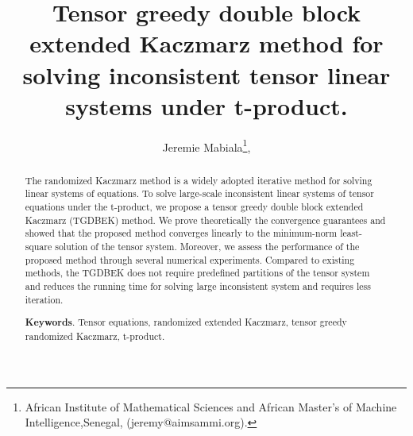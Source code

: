 \documentclass[11pt]{article}
\title{
Tensor greedy double block extended Kaczmarz method for solving inconsistent tensor linear systems under t-product.
}
\author{Jeremie Mabiala\thanks{African Institute of  Mathematical Sciences and African Master's of Machine Intelligence,Senegal, (jeremy@aimsammi.org).},%
}
\date{}
\begin{document}
\maketitle

\begin{abstract} 

The randomized Kaczmarz method is a widely adopted iterative method for solving  linear systems of equations. To solve large-scale inconsistent linear systems of tensor equations under the t-product, we propose a tensor greedy double block extended Kaczmarz (TGDBEK) method. We prove  theoretically the convergence guarantees and showed that the proposed method converges linearly to the minimum-norm least-square solution of the tensor system. Moreover, we assess the performance of the proposed method through several numerical experiments. Compared to existing methods, the TGDBEK does not require predefined partitions of the tensor system and reduces the running time for solving large inconsistent system and requires less iteration.

\vspace{.5mm} 

{\bf Keywords}. Tensor equations, randomized extended Kaczmarz, tensor greedy randomized Kaczmarz,  t-product.


\end{abstract}
\end{document}
